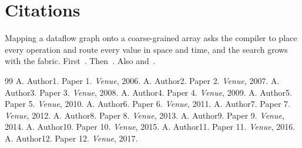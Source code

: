 \documentclass{article}
\begin{document}
\section{Citations}
Mapping a dataflow graph onto a coarse-grained array asks the compiler to place every operation and route every value in space and time, and the search grows with the fabric. First~\cite{k01,k03,k11}. Then~\citep{k04}. Also \citet{k06} and~\cite{k07,k08,k09,k10,k12}.

\begin{thebibliography}{99}
 A. Author1. Paper 1. \emph{Venue}, 2006.
 A. Author2. Paper 2. \emph{Venue}, 2007.
 A. Author3. Paper 3. \emph{Venue}, 2008.
 A. Author4. Paper 4. \emph{Venue}, 2009.
 A. Author5. Paper 5. \emph{Venue}, 2010.
 A. Author6. Paper 6. \emph{Venue}, 2011.
 A. Author7. Paper 7. \emph{Venue}, 2012.
 A. Author8. Paper 8. \emph{Venue}, 2013.
 A. Author9. Paper 9. \emph{Venue}, 2014.
 A. Author10. Paper 10. \emph{Venue}, 2015.
 A. Author11. Paper 11. \emph{Venue}, 2016.
 A. Author12. Paper 12. \emph{Venue}, 2017.
\end{thebibliography}
\end{document}
